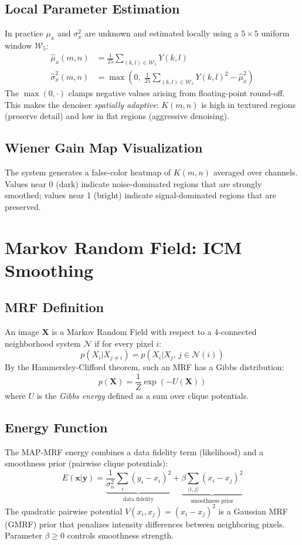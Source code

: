\documentclass[10pt,conference]{IEEEtran}
\begin{document}
\subsection{Local Parameter Estimation}
In practice $\mu_x$ and $\sigma_x^2$ are unknown and estimated locally using a $5\times5$ uniform window $\mathcal{W}_5$:
\begin{align}
\hat{\mu}_x(m,n) &= \frac{1}{25}\sum_{(k,l)\in\mathcal{W}_5} Y(k,l) \\
\hat{\sigma}_x^2(m,n) &= \max\!\left(0,\;\frac{1}{25}\sum_{(k,l)\in\mathcal{W}_5} Y(k,l)^2 - \hat{\mu}_x^2\right)
\end{align}
The $\max(0,\cdot)$ clamps negative values arising from floating-point round-off. This makes the denoiser \emph{spatially adaptive}: $K(m,n)$ is high in textured regions (preserve detail) and low in flat regions (aggressive denoising).

\subsection{Wiener Gain Map Visualization}
The system generates a false-color heatmap of $K(m,n)$ averaged over channels. Values near 0 (dark) indicate noise-dominated regions that are strongly smoothed; values near 1 (bright) indicate signal-dominated regions that are preserved.

\section{Markov Random Field: ICM Smoothing}

\subsection{MRF Definition}
An image $\mathbf{X}$ is a Markov Random Field with respect to a 4-connected neighborhood system $\mathcal{N}$ if for every pixel $i$:
\begin{equation}
p(X_i | X_{j \neq i}) = p(X_i | X_j,\, j \in \mathcal{N}(i))
\end{equation}
By the Hammersley-Clifford theorem, such an MRF has a Gibbs distribution:
\begin{equation}
p(\mathbf{X}) = \frac{1}{Z}\exp(-U(\mathbf{X}))
\end{equation}
where $U$ is the \emph{Gibbs energy} defined as a sum over clique potentials.

\subsection{Energy Function}
The MAP-MRF energy combines a data fidelity term (likelihood) and a smoothness prior (pairwise clique potentials):
\begin{equation}
E(\mathbf{x}|\mathbf{y}) = \underbrace{\frac{1}{\sigma_n^2}\sum_i (y_i - x_i)^2}_{\text{data fidelity}} + \underbrace{\beta \sum_{\langle i,j\rangle} (x_i - x_j)^2}_{\text{smoothness prior}}
\label{eq:mrf_energy}
\end{equation}
The quadratic pairwise potential $V(x_i,x_j) = (x_i-x_j)^2$ is a Gaussian MRF (GMRF) prior that penalizes intensity differences between neighboring pixels. Parameter $\beta \geq 0$ controls smoothness strength.
\end{document}
